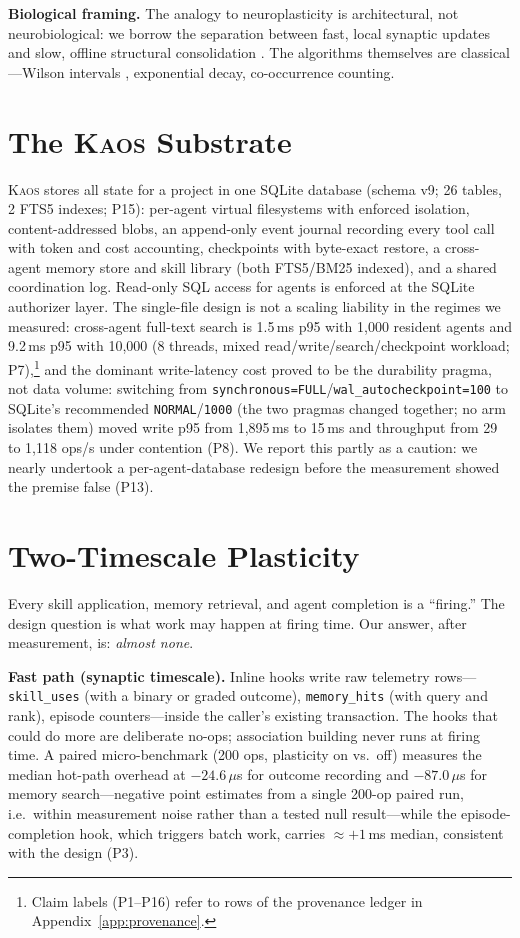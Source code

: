 \documentclass[11pt]{article}
\newcommand{\kaos}{\textsc{Kaos}}
\begin{document}
\textbf{Biological framing.} The analogy to neuroplasticity is architectural, not neurobiological: we borrow the separation between fast, local synaptic updates \citep{hebb1949organization} and slow, offline structural consolidation \citep{tononi2014sleep}. The algorithms themselves are classical---Wilson intervals \citep{wilson1927probable}, exponential decay, co-occurrence counting.

\section{The \kaos{} Substrate}
\label{sec:substrate}

\kaos{} stores all state for a project in one SQLite database (schema v9; 26 tables, 2 FTS5 indexes; P15): per-agent virtual filesystems with enforced isolation, content-addressed blobs, an append-only event journal recording every tool call with token and cost accounting, checkpoints with byte-exact restore, a cross-agent memory store and skill library (both FTS5/BM25 indexed), and a shared coordination log. Read-only SQL access for agents is enforced at the SQLite authorizer layer. The single-file design is not a scaling liability in the regimes we measured: cross-agent full-text search is 1.5\,ms p95 with 1{,}000 resident agents and 9.2\,ms p95 with 10{,}000 (8 threads, mixed read/write/search/checkpoint workload; P7),\footnote{Claim labels (P1--P16) refer to rows of the provenance ledger in Appendix~\ref{app:provenance}.} and the dominant write-latency cost proved to be the durability pragma, not data volume: switching from \texttt{synchronous=FULL}/\texttt{wal\_autocheckpoint=100} to SQLite's recommended \texttt{NORMAL}/\texttt{1000} (the two pragmas changed together; no arm isolates them) moved write p95 from 1{,}895\,ms to 15\,ms and throughput from 29 to 1{,}118 ops/s under contention (P8). We report this partly as a caution: we nearly undertook a per-agent-database redesign before the measurement showed the premise false (P13).

\section{Two-Timescale Plasticity}
\label{sec:arch}

Every skill application, memory retrieval, and agent completion is a ``firing.'' The design question is what work may happen at firing time. Our answer, after measurement, is: \emph{almost none}.

\textbf{Fast path (synaptic timescale).} Inline hooks write raw telemetry rows---\texttt{skill\_uses} (with a binary or graded outcome), \texttt{memory\_hits} (with query and rank), episode counters---inside the caller's existing transaction. The hooks that could do more are deliberate no-ops; association building never runs at firing time. A paired micro-benchmark (200 ops, plasticity on vs.\ off) measures the median hot-path overhead at $-24.6\,\mu$s for outcome recording and $-87.0\,\mu$s for memory search---negative point estimates from a single 200-op paired run, i.e.\ within measurement noise rather than a tested null result---while the episode-completion hook, which triggers batch work, carries $\approx{+}1$\,ms median, consistent with the design (P3).
\end{document}
